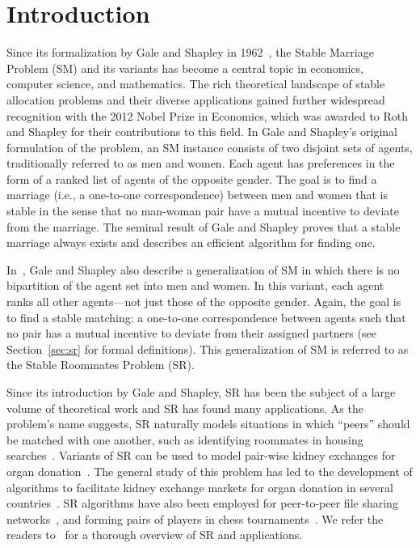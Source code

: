 \section{Introduction}

Since its formalization by Gale and Shapley in 1962~\cite{GS62}, the Stable Marriage Problem (SM) and its variants has become a central topic in economics, computer science, and mathematics. The rich theoretical landscape of stable allocation problems and their diverse applications gained further widespread recognition with the 2012 Nobel Prize in Economics, which was awarded to Roth and Shapley for their contributions to this field. In Gale and Shapley's original formulation of the problem, an SM instance consists of two disjoint sets of agents, traditionally referred to as men and women. Each agent has preferences in the form of a ranked list of agents of the opposite gender. The goal is to find a marriage (i.e., a one-to-one correspondence) between men and women that is stable in the sense that no man-woman pair have a mutual incentive to deviate from the marriage. The seminal result of Gale and Shapley proves that a stable marriage always exists and describes an efficient algorithm for finding one.

In~\cite{GS62}, Gale and Shapley also describe a generalization of SM in which there is no bipartition of the agent set into men and women. In this variant, each agent ranks all other agents---not just those of the opposite gender. Again, the goal is to find a stable matching: a one-to-one correspondence between agents such that no pair has a mutual incentive to deviate from their assigned partners (see Section~\ref{sec:sr} for formal definitions). This generalization of SM is referred to as the Stable Roommates Problem (SR).

Since its introduction by Gale and Shapley, SR has been the subject of a large volume of theoretical work and SR has found many applications. As the problem's name suggests, SR naturally models situations in which ``peers'' should be matched with one another, such as identifying roommates in housing searches~\cite{Perach2008-stable}. Variants of SR can be used to model pair-wise kidney exchanges for organ donation~\cite{Roth2005-pairwise}. The general study of this problem has led to the development of algorithms to facilitate kidney exchange markets for organ donation in several countries~\cite{PairedDonation, LivingKidneyDonation, deKlerka2005-dutch}. SR algorithms have also been employed for peer-to-peer file sharing networks~\cite{Lebedev2007-p2p, Mathieu2010-acyclic}, and forming pairs of players in chess tournaments~\cite{Kujansuu1999-stable}. We refer the readers to~\cite{Manlove2013-algorithmics} for a thorough overview of SR and applications.

